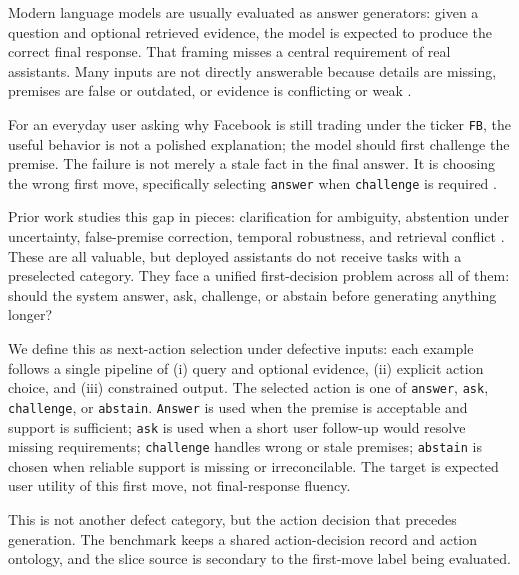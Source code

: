 Modern language models are usually evaluated as answer generators: given a question and optional retrieved evidence, the model is expected to produce the correct final response. That framing misses a central requirement of real assistants. Many inputs are not directly answerable because details are missing, premises are false or outdated, or evidence is conflicting or weak \citep{aliannejadi-etal-2019-asking,yu-etal-2023-crepe,thorne-etal-2018-fever,kasai-etal-2023-realtimeqa,zhang-choi-2021-situatedqa,shaier-etal-2024-adaptive}.

For an everyday user asking why Facebook is still trading under the ticker \texttt{FB}, the useful behavior is not a polished explanation; the model should first challenge the premise. The failure is not merely a stale fact in the final answer. It is choosing the wrong first move, specifically selecting \texttt{answer} when \texttt{challenge} is required \citep{lin-etal-2022-truthfulqa,vu-etal-2023-freshllms}.

Prior work studies this gap in pieces: clarification for ambiguity, abstention under uncertainty, false-premise correction, temporal robustness, and retrieval conflict \citep{min-etal-2020-ambigqa,kamath-etal-2020-selective,geifman-el-yaniv-2017-selective,yu-etal-2023-crepe,kasai-etal-2023-realtimeqa,liu-etal-2025-open}. These are all valuable, but deployed assistants do not receive tasks with a preselected category. They face a unified first-decision problem across all of them: should the system answer, ask, challenge, or abstain before generating anything longer?

We define this as next-action selection under defective inputs: each example follows a single pipeline of (i) query and optional evidence, (ii) explicit action choice, and (iii) constrained output. The selected action is one of \texttt{answer}, \texttt{ask}, \texttt{challenge}, or \texttt{abstain}. \texttt{Answer} is used when the premise is acceptable and support is sufficient; \texttt{ask} is used when a short user follow-up would resolve missing requirements; \texttt{challenge} handles wrong or stale premises; \texttt{abstain} is chosen when reliable support is missing or irreconcilable. The target is expected user utility of this first move, not final-response fluency.

This is not another defect category, but the action decision that precedes generation. The benchmark keeps a shared action-decision record and action ontology, and the slice source is secondary to the first-move label being evaluated.

